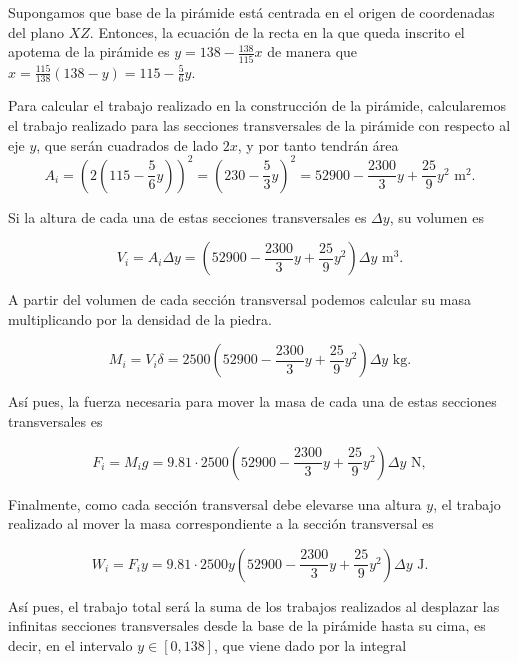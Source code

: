 \documentclass[
  spanish,
  a4paper,
]{scrreport}
\theoremstyle{definition}
\theoremstyle{remark}
\begin{document}
\begin{tcolorbox}[enhanced jigsaw, arc=.35mm, bottomrule=.15mm, bottomtitle=1mm, breakable, colback=white, colbacktitle=quarto-callout-tip-color!10!white, colframe=quarto-callout-tip-color-frame, coltitle=black, left=2mm, leftrule=.75mm, opacityback=0, opacitybacktitle=0.6, rightrule=.15mm, title=\textcolor{quarto-callout-tip-color}{\faLightbulb}\hspace{0.5em}{Solución}, titlerule=0mm, toprule=.15mm, toptitle=1mm]

Supongamos que base de la pirámide está centrada en el origen de
coordenadas del plano \(XZ\). Entonces, la ecuación de la recta en la
que queda inscrito el apotema de la pirámide es
\(y=138-\frac{138}{115}x\) de manera que
\(x=\frac{115}{138}(138-y)=115-\frac{5}{6}y\).

Para calcular el trabajo realizado en la construcción de la pirámide,
calcularemos el trabajo realizado para las secciones transversales de la
pirámide con respecto al eje \(y\), que serán cuadrados de lado \(2x\),
y por tanto tendrán área \[
A_i
= \left(2\left(115-\frac{5}{6}y\right)\right)^2 
= \left(230-\frac{5}{3}y\right)^2
= 52900 -\frac{2300}{3}y +\frac{25}{9}y^2 \mbox{ m$^2$}.
\]

Si la altura de cada una de estas secciones transversales es
\(\Delta y\), su volumen es

\[
V_i = A_i\Delta y = \left(52900 -\frac{2300}{3}y +\frac{25}{9}y^2\right)\Delta y \mbox{ m$^3$}.
\]

A partir del volumen de cada sección transversal podemos calcular su
masa multiplicando por la densidad de la piedra.

\[
M_i = V_i\delta = 2500 \left(52900 -\frac{2300}{3}y +\frac{25}{9}y^2\right)\Delta y \mbox{ kg}.
\]

Así pues, la fuerza necesaria para mover la masa de cada una de estas
secciones transversales es

\[
F_i = M_i g = 9.81\cdot 2500 \left(52900 -\frac{2300}{3}y +\frac{25}{9}y^2\right)\Delta y \mbox{ N},
\]

Finalmente, como cada sección transversal debe elevarse una altura
\(y\), el trabajo realizado al mover la masa correspondiente a la
sección transversal es

\[
W_i = F_i y = 9.81\cdot 2500 y \left(52900 -\frac{2300}{3}y +\frac{25}{9}y^2\right)\Delta y \mbox{ J}.
\]

Así pues, el trabajo total será la suma de los trabajos realizados al
desplazar las infinitas secciones transversales desde la base de la
pirámide hasta su cima, es decir, en el intervalo \(y\in [0,138]\), que
viene dado por la integral


\end{tcolorbox}
\end{document}

